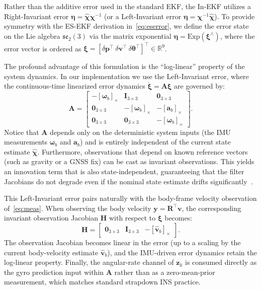 \documentclass[conference]{IEEEtran}
\begin{document}
Rather than the additive error used in the standard EKF, the In-EKF utilizes a Right-Invariant error $\boldsymbol{\eta} = \hat{\boldsymbol{\chi}} \boldsymbol{\chi}^{-1}$ (or a Left-Invariant error $\boldsymbol{\eta} = \boldsymbol{\chi}^{-1} \hat{\boldsymbol{\chi}}$). To provide symmetry with the ES-EKF derivation in~\eqref{eq:eserror}, we define the error state on the Lie algebra $\mathfrak{se}_2(3)$ via the matrix exponential $\boldsymbol{\eta} = \mathrm{Exp}(\boldsymbol{\xi}^\wedge)$, where the error vector is ordered as $\boldsymbol{\xi} = [\delta\mathbf{p}^\top\ \delta\mathbf{v}^\top\ \delta\boldsymbol{\theta}^\top]^\top \in \mathbb{R}^9$.

The profound advantage of this formulation is the ``log-linear'' property of the system dynamics. In our implementation we use the Left-Invariant error, where the continuous-time linearized error dynamics $\dot{\boldsymbol{\xi}} = \mathbf{A} \boldsymbol{\xi}$ are governed by:
\begin{equation}
  \mathbf{A} = 
  \begin{bmatrix}
    -[\boldsymbol{\omega}_b]_\times & \mathbf{I}_{3\times3} & \mathbf{0}_{3\times3} \\
    \mathbf{0}_{3\times3} & -[\boldsymbol{\omega}_b]_\times & -[\mathbf{a}_b]_\times \\
    \mathbf{0}_{3\times3} & \mathbf{0}_{3\times3} & -[\boldsymbol{\omega}_b]_\times
  \end{bmatrix}.
  \label{eq:inekf_predict}
\end{equation}
Notice that $\mathbf{A}$ depends only on the deterministic system inputs (the IMU measurements $\boldsymbol{\omega}_b$ and $\mathbf{a}_b$) and is entirely independent of the current state estimate $\hat{\boldsymbol{\chi}}$. Furthermore, observations that depend on known reference vectors (such as gravity or a GNSS fix) can be cast as invariant observations. This yields an innovation term that is also state-independent, guaranteeing that the filter Jacobians do not degrade even if the nominal state estimate drifts significantly~\cite{barrau2017invariant}.

This Left-Invariant error pairs naturally with the body-frame velocity observation of~\eqref{eq:meas}. When observing the body velocity $\mathbf{y} = \mathbf{R}^\top \mathbf{v}$, the corresponding invariant observation Jacobian $\mathbf{H}$ with respect to $\boldsymbol{\xi}$ becomes:
\begin{equation}
  \mathbf{H} = 
  \begin{bmatrix}
    \mathbf{0}_{3\times3} & \mathbf{I}_{3\times3} & -[\hat{\mathbf{v}}_b]_\times
  \end{bmatrix}.
  \label{eq:inekf_update}
\end{equation}
The observation Jacobian becomes linear in the error (up to a scaling by the current body-velocity estimate $\hat{\mathbf{v}}_b$), and the IMU-driven error dynamics retain the log-linear property. Finally, the angular-rate channel of $\mathbf{z}_k$ is consumed directly as the gyro prediction input within $\mathbf{A}$ rather than as a zero-mean-prior measurement, which matches standard strapdown INS practice.
\end{document}
